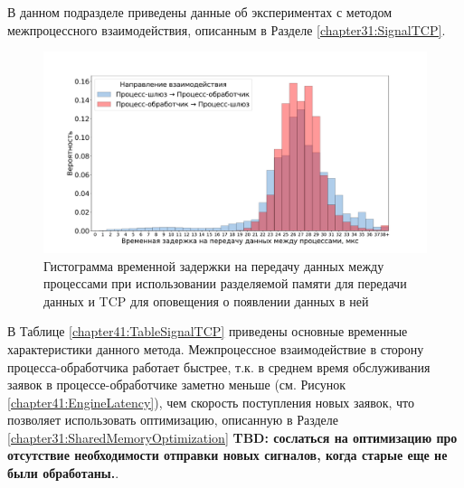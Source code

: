 В данном подразделе приведены данные об экспериментах с методом межпроцессного взаимодействия, описанным в Разделе \ref{chapter31:SignalTCP}.

\begin{figure}[!h]
\caption{Гистограмма временной задержки на передачу данных между процессами при использовании разделяемой памяти для передачи данных и TCP для оповещения о появлении данных в ней}
\label{chapter41:FigSignalTCP}
\includegraphics[width=\textwidth]{../../graphics/hist/SignalTCP}
\end{figure}

В Таблице \ref{chapter41:TableSignalTCP} приведены основные временные характеристики данного метода. Межпроцессное взаимодействие в сторону процесса-обработчика работает быстрее, т.к. в среднем время обслуживания заявок в процессе-обработчике заметно меньше (см. Рисунок \ref{chapter41:EngineLatency}), чем скорость поступления новых заявок, что позволяет использовать оптимизацию, описанную в Разделе \ref{chapter31:SharedMemoryOptimization} \textbf{TBD: сослаться на оптимизацию про отсутствие необходимости отправки новых сигналов, когда старые еще не были обработаны.}.

